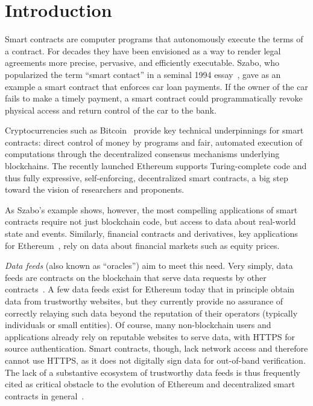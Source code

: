 \section{Introduction}

Smart contracts are computer programs that autonomously execute the terms of a contract.
For decades they have been envisioned as a way to render legal agreements more precise, pervasive, and efficiently executable.
Szabo, who popularized the term ``smart contact'' in a seminal 1994 essay~\cite{szabosmartcontract94}, gave as an example a smart contract that enforces car loan payments. If the owner of the car fails to make a timely payment, a smart contract could programmatically revoke physical access and return control of the car to the bank. %

Cryptocurrencies such as Bitcoin~\cite{bitcoin} provide key technical underpinnings for smart contracts: direct control of money by programs and fair, automated execution of computations through the decentralized consensus mechanisms underlying  blockchains. 
The recently launched Ethereum supports Turing-complete code and thus fully expressive, self-enforcing, decentralized smart contracts, a big step toward the vision of researchers and proponents.  

As Szabo's example shows, however, the most compelling applications of smart contracts require not just blockchain code, but access to data about real-world state and events. Similarly, financial contracts and derivatives, key applications for Ethereum~\cite{yellowpaper,whitepaper}, rely on data about financial markets such as equity prices. %

\emph{Data feeds} (also known as ``oracles'') aim to meet this need. Very simply, data feeds are contracts on the blockchain that serve data requests by other contracts~\cite{whitepaper,yellowpaper}. A few data feeds exist for Ethereum today that in principle obtain data from trustworthy websites, but they currently provide no assurance of correctly relaying such data beyond the reputation of their operators (typically individuals or small entities). Of course, many non-blockchain users and applications already rely on reputable websites to serve data, with HTTPS for source authentication. Smart contracts, though, lack network access and therefore cannot use HTTPS, as it does not digitally sign data for out-of-band verification. The lack of a substantive ecosystem of trustworthy data feeds is thus frequently cited as critical obstacle to the evolution of Ethereum and decentralized smart contracts 
in general~\cite{commblockstream}.

